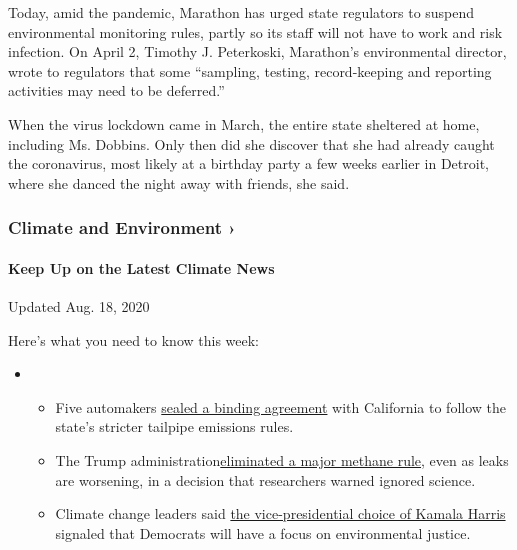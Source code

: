 Today, amid the pandemic, Marathon has urged state regulators to suspend
environmental monitoring rules, partly so its staff will not have to
work and risk infection. On April 2, Timothy J. Peterkoski, Marathon's
environmental director, wrote to regulators that some ``sampling,
testing, record-keeping and reporting activities may need to be
deferred.''

When the virus lockdown came in March, the entire state sheltered at
home, including Ms. Dobbins. Only then did she discover that she had
already caught the coronavirus, most likely at a birthday party a few
weeks earlier in Detroit, where she danced the night away with friends,
she said.

\href{https://www.nytimes3xbfgragh.onion/section/climate?action=click\&pgtype=Article\&state=default\&region=MAIN_CONTENT_1\&context=storylines_keepup}{}

\hypertarget{climate-and-environment-}{%
\subsubsection{Climate and Environment
›}\label{climate-and-environment-}}

\hypertarget{keep-up-on-the-latest-climate-news}{%
\paragraph{Keep Up on the Latest Climate
News}\label{keep-up-on-the-latest-climate-news}}

Updated Aug. 18, 2020

Here's what you need to know this week:

\begin{itemize}
\item
  \begin{itemize}
  \tightlist
  \item
    Five automakers
    \href{https://www.nytimes3xbfgragh.onion/2020/08/17/climate/california-automakers-pollution.html?action=click\&pgtype=Article\&state=default\&region=MAIN_CONTENT_1\&context=storylines_keepup}{sealed
    a binding agreement} with California to follow the state's stricter
    tailpipe emissions rules.
  \item
    The Trump
    administration\href{https://www.nytimes3xbfgragh.onion/2020/08/13/climate/trump-methane.html?action=click\&pgtype=Article\&state=default\&region=MAIN_CONTENT_1\&context=storylines_keepup}{eliminated
    a major methane rule}, even as leaks are worsening, in a decision
    that researchers warned ignored science.
  \item
    Climate change leaders said
    \href{https://www.nytimes3xbfgragh.onion/2020/08/12/climate/kamala-harris-environmental-justice.html?action=click\&pgtype=Article\&state=default\&region=MAIN_CONTENT_1\&context=storylines_keepup}{the
    vice-presidential choice of Kamala Harris} signaled that Democrats
    will have a focus on environmental justice.
  \end{itemize}
\end{itemize}

